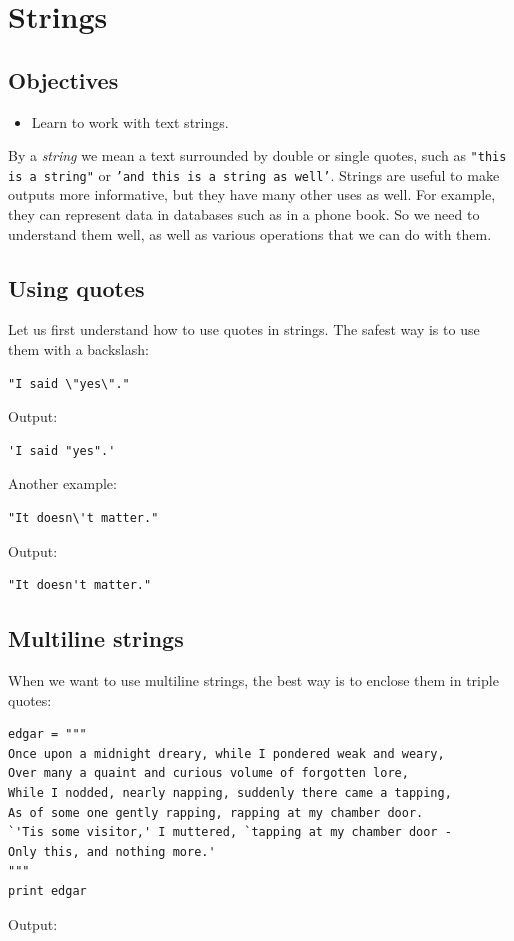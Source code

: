 \section{Strings}

\subsection{Objectives}

\begin{itemize}
\item Learn to work with text strings.
\end{itemize}
By a {\em string} we mean a text surrounded by double or single quotes, such as 
{\tt "this is a string"} or {\tt 'and this is a string as well'}.
Strings are useful to make outputs more informative, but 
they have many other uses as well. For example, they can represent data 
in databases such as in a phone book. So we need to understand them well,
as well as various operations that we can do with them.

\subsection{Using quotes}

Let us first understand how to use quotes in strings. The safest way is to use 
them with a backslash:

\begin{verbatim}
"I said \"yes\"."
\end{verbatim}
Output:

\begin{verbatim}
'I said "yes".'
\end{verbatim}
Another example:

\begin{verbatim}
"It doesn\'t matter."
\end{verbatim}
Output:

\begin{verbatim}
"It doesn't matter."
\end{verbatim}

\subsection{Multiline strings}

When we want to use multiline strings, the best way is to enclose them 
in triple quotes:

\begin{verbatim}
edgar = """
Once upon a midnight dreary, while I pondered weak and weary,
Over many a quaint and curious volume of forgotten lore,
While I nodded, nearly napping, suddenly there came a tapping,
As of some one gently rapping, rapping at my chamber door.
`'Tis some visitor,' I muttered, `tapping at my chamber door -
Only this, and nothing more.'
"""
print edgar
\end{verbatim}
Output:

